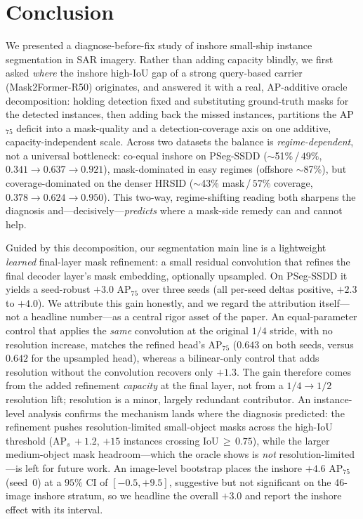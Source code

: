 \documentclass[journal]{IEEEtran}
\begin{document}
\section{Conclusion}
\label{sec:conclusion}
We presented a diagnose-before-fix study of inshore small-ship instance segmentation in SAR imagery. Rather than adding capacity blindly, we first asked \emph{where} the inshore high-IoU gap of a strong query-based carrier (Mask2Former-R50) originates, and answered it with a real, AP-additive oracle decomposition: holding detection fixed and substituting ground-truth masks for the detected instances, then adding back the missed instances, partitions the AP$_{75}$ deficit into a mask-quality and a detection-coverage axis on one additive, capacity-independent scale. Across two datasets the balance is \emph{regime-dependent}, not a universal bottleneck: co-equal inshore on PSeg-SSDD ($\sim$51\%\,/\,$49\%$, $0.341\!\rightarrow\!0.637\!\rightarrow\!0.921$), mask-dominated in easy regimes (offshore $\sim$87\%), but coverage-dominated on the denser HRSID ($\sim$43\% mask\,/\,$57\%$ coverage, $0.378\!\rightarrow\!0.624\!\rightarrow\!0.950$). This two-way, regime-shifting reading both sharpens the diagnosis and---decisively---\emph{predicts} where a mask-side remedy can and cannot help.

Guided by this decomposition, our segmentation main line is a lightweight \emph{learned} final-layer mask refinement: a small residual convolution that refines the final decoder layer's mask embedding, optionally upsampled. On PSeg-SSDD it yields a seed-robust $+3.0$ AP$_{75}$ over three seeds (all per-seed deltas positive, $+2.3$ to $+4.0$). We attribute this gain honestly, and we regard the attribution itself---not a headline number---as a central rigor asset of the paper. An equal-parameter control that applies the \emph{same} convolution at the original $1/4$ stride, with no resolution increase, matches the refined head's AP$_{75}$ ($0.643$ on both seeds, versus $0.642$ for the upsampled head), whereas a bilinear-only control that adds resolution without the convolution recovers only $+1.3$. The gain therefore comes from the added refinement \emph{capacity} at the final layer, not from a $1/4\!\rightarrow\!1/2$ resolution lift; resolution is a minor, largely redundant contributor. An instance-level analysis confirms the mechanism lands where the diagnosis predicted: the refinement pushes resolution-limited small-object masks across the high-IoU threshold (AP$_{s}\,{+}1.2$, $+15$ instances crossing IoU$\,{\ge}\,0.75$), while the larger medium-object mask headroom---which the oracle shows is \emph{not} resolution-limited---is left for future work. An image-level bootstrap places the inshore $+4.6$ AP$_{75}$ (seed~0) at a $95\%$ CI of $[-0.5,+9.5]$, suggestive but not significant on the 46-image inshore stratum, so we headline the overall $+3.0$ and report the inshore effect with its interval.
\end{document}
